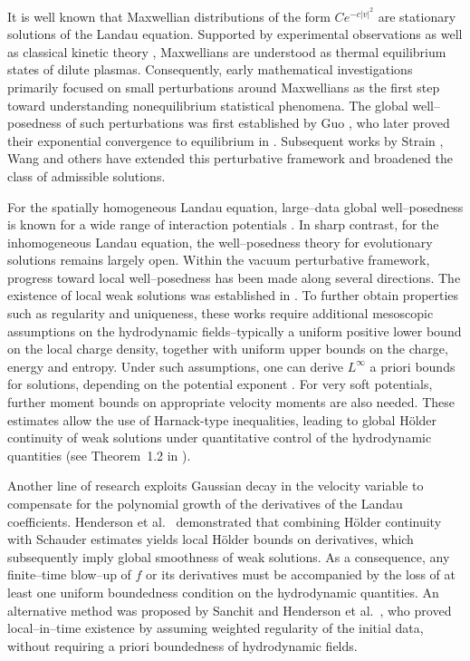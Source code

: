 \documentclass[reqno,11pt,final]{amsart}
\theoremstyle{plain}
\numberwithin{equation}{section}
\numberwithin{theorem}{section}
\begin{document}
It is well known that Maxwellian distributions of the form $Ce^{-c|v|^2}$ are stationary solutions of the Landau equation. Supported by experimental observations \cite{Phy.L_Tokuda_2021, Phy.L_Mannion_2023} as well as classical kinetic theory \cite{HL_Guo_2002, VPL_Guo_2012, VPL_Strain_2012, VPL_Wang_2012}, Maxwellians are understood as thermal equilibrium states of dilute plasmas. Consequently, early mathematical investigations primarily focused on small perturbations around Maxwellians as the first step toward understanding nonequilibrium statistical phenomena. The global well--posedness of such perturbations was first established by Guo \cite{HL_Guo_2002}, who later proved their exponential convergence to equilibrium in \cite{VPL_Guo_2012}. Subsequent works by Strain \cite{VPL_Strain_2012}, Wang \cite{VPL_Wang_2012} and others have extended this perturbative framework and broadened the class of admissible solutions.

For the spatially homogeneous Landau equation, large--data global well--posedness is known for a wide range of interaction potentials \cite{HL_Silvestre_2023, HL_Arsenev_1977, HL_Villani_1998, HL_Villani_2000_1, HL_Villani_2000_2, HL_Villani_2000_3}. In sharp contrast, for the inhomogeneous Landau equation, the well--posedness theory for evolutionary solutions remains largely open. Within the vacuum perturbative framework, progress toward local well--posedness has been made along several directions. The existence of local weak solutions was established in \cite{IHL_Henderson_2019, IHL_Sanchit_2019, IHL_Snelson_2019, IHL_Snelson_2024}. To further obtain properties such as regularity and uniqueness, these works require additional mesoscopic assumptions on the hydrodynamic fields--typically a uniform positive lower bound on the local charge density, together with uniform upper bounds on the charge, energy and entropy. Under such assumptions, one can derive $L^\infty$ a priori bounds for solutions, depending on the potential exponent \cite{IHL_Cameron_2018, IHL_Snelson_2018, IHL_Snelson_2023}. For very soft potentials, further moment bounds on appropriate velocity moments are also needed. These estimates allow the use of Harnack-type inequalities, leading to global Hölder continuity of weak solutions under quantitative control of the hydrodynamic quantities (see Theorem~1.2 in \cite{IHL_Cameron_2018}).

Another line of research exploits Gaussian decay in the velocity variable \cite{IHL_Snelson_2018} to compensate for the polynomial growth of the derivatives of the Landau coefficients. Henderson et al.~\cite{IHL_Henderson_2019} demonstrated that combining H\"older continuity with Schauder estimates yields local Hölder bounds on derivatives, which subsequently imply global smoothness of weak solutions. As a consequence, any finite--time blow--up of $f$ or its derivatives must be accompanied by the loss of at least one uniform boundedness condition on the hydrodynamic quantities. An alternative method was proposed by Sanchit and Henderson et al.~\cite{IHL_Snelson_2019,IHL_Sanchit_2019}, who proved local--in--time existence by assuming weighted regularity of the initial data, without requiring a priori boundedness of hydrodynamic fields.
\end{document}
